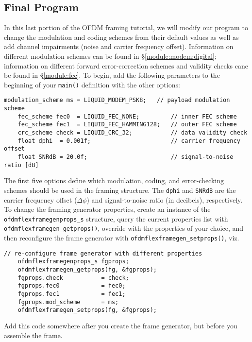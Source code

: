 %
%
\subsection{Final Program}
\label{tutorial:ofdmflexframe:final}

In this last portion of the OFDM framing tutorial, we will modify our
program to change the modulation and coding schemes from their default
values
as well as add channel impairments (noise and carrier frequency offset).
Information on different modulation schemes can be found in
  \S\ref{module:modem:digital};
information on different forward error-correction schemes and validity
checks cane be found in
  \S\ref{module:fec}.
%
To begin, add the following parameters to the beginning of your
{\tt main()} definition with the other options:
%
\begin{Verbatim}[fontsize=\small]
    modulation_scheme ms = LIQUID_MODEM_PSK8;   // payload modulation scheme
    fec_scheme fec0  = LIQUID_FEC_NONE;         // inner FEC scheme
    fec_scheme fec1  = LIQUID_FEC_HAMMING128;   // outer FEC scheme
    crc_scheme check = LIQUID_CRC_32;           // data validity check
    float dphi  = 0.001f;                       // carrier frequency offset
    float SNRdB = 20.0f;                        // signal-to-noise ratio [dB]
\end{Verbatim}
%
The first five options define which modulation, coding, and
error-checking schemes should be used in the framing structure.
The {\tt dphi} and {\tt SNRdB} are the carrier frequency offset
($\Delta\phi$) and signal-to-noise ratio (in decibels), respectively.
%
To change the framing generator properties, create an instance of the
{\tt ofdmflexframegenprops\_s} structure,
query the current properties list with
{\tt ofdmflexframegen\_getprops()},
override with the properties of your choice,
and then reconfigure the frame generator with
{\tt ofdmflexframegen\_setprops()}, viz.
%
\begin{Verbatim}[fontsize=\small]
    // re-configure frame generator with different properties
    ofdmflexframegenprops_s fgprops;
    ofdmflexframegen_getprops(fg, &fgprops);
    fgprops.check           = check;
    fgprops.fec0            = fec0;
    fgprops.fec1            = fec1;
    fgprops.mod_scheme      = ms;
    ofdmflexframegen_setprops(fg, &fgprops);
\end{Verbatim}
%
%
Add this code somewhere after you create the frame generator, but before
you assemble the frame.

